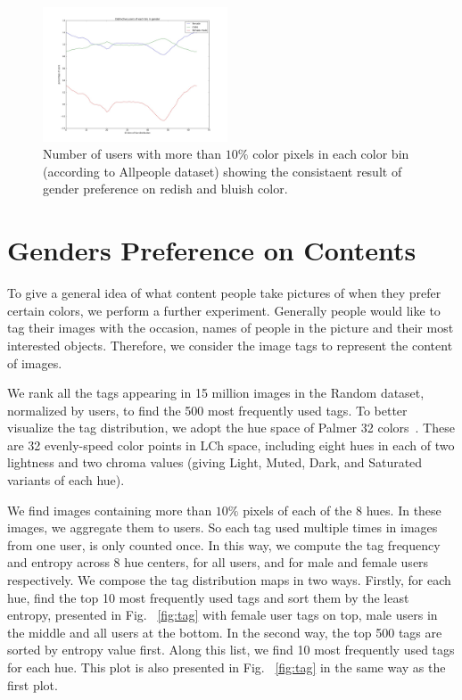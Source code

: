 \begin{figure}[t]
 \centering
    \includegraphics[width=0.489\textwidth]{figures/chapter3/topusergender.jpeg}
 \caption{Number of users with more than $10\%$ color pixels in each color bin (according to Allpeople dataset) showing the consistaent result of gender preference on redish and bluish color.}
 \label{fig:user}
\end{figure}

\section{Genders Preference on Contents}

To give a general idea of what content people take pictures of when they prefer certain colors, we perform a further experiment. Generally people would like to tag their images with the occasion, names of people in the picture and their most interested objects. Therefore, we consider the image tags to represent the content of images.

We rank all the tags appearing in 15 million images in the Random dataset, normalized by users, to find the 500 most frequently used tags. To better visualize the tag distribution, we adopt the hue space of Palmer 32 colors~\cite{palmer32color}. 
These are 32 evenly-speed color points in LCh space, including eight hues in each of two lightness and two chroma values (giving Light, Muted, Dark, and Saturated variants of each hue).

We find images containing more than $10\%$ pixels of each of the 8 hues.
In these images, we aggregate them to users. So each tag used multiple times in images from one user, is only counted once. 
In this way, we compute the tag frequency and entropy across 8 hue centers, for all users, and for male and female users respectively.
We compose the tag distribution maps in two ways.
Firstly, for each hue, find the top 10 most frequently used tags and sort them by the least entropy, presented in Fig. ~\ref{fig:tag} with female user tags on top, male users in the middle and all users at the bottom.
In the second way, the top 500 tags are sorted by entropy value first. Along this list, we find 10 most frequently used tags for each hue. This plot is also presented in Fig. ~\ref{fig:tag} in the same way as the first plot.

